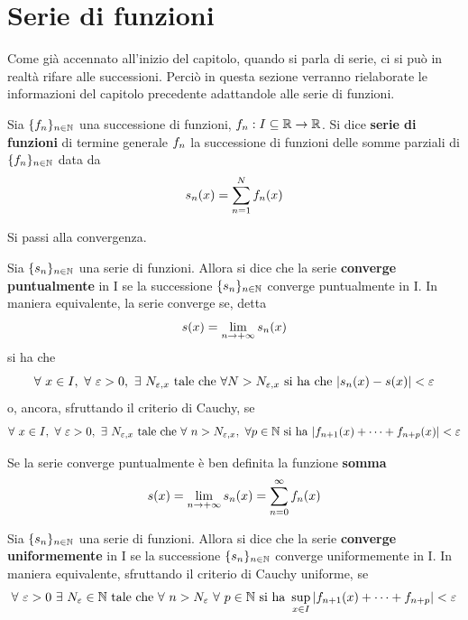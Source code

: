 \section{Serie di funzioni}
Come già accennato all'inizio del capitolo, quando si parla di serie, ci si può in realtà rifare alle successioni. Perciò in questa sezione verranno rielaborate le informazioni del capitolo precedente adattandole alle serie di funzioni.
\begin{definition}
    Sia $\{f_n\}_{n \in \mathbb{N}}$ una successione di funzioni, $f_n: I \subseteq \mathbb{R} \to \mathbb{R}$. Si dice \textbf{serie di funzioni} di termine generale $f_n$ la successione di funzioni delle somme parziali di $\{f_n\}_{n \in \mathbb{N}}$ data da
    \begin{equation}
        s_n(x)=\sum\limits_{n=1}^{N}{f_n(x)}
    \end{equation}
\end{definition}
Si passi alla convergenza.
\begin{definition}
    Sia $\{s_n\}_{n \in \mathbb{N}}$ una serie di funzioni. Allora si dice che la serie \textbf{converge puntualmente} in I se la successione $\{s_n\}_{n \in \mathbb{N}}$ converge puntualmente in I. In maniera equivalente, la serie converge se, detta
    \begin{equation}
        s(x)=\lim_{n \to +\infty}{s_n(x)}
    \end{equation}
    si ha che
    \begin{equation}
        \forall\ x \in I,\ \forall\ \varepsilon>0,\ \exists\ N_{\varepsilon, x}\ \text{tale che}\ \forall N>N_{\varepsilon, x}\ \text{si ha che}\ |\sn(x)-s(x)|< \varepsilon
    \end{equation}
    o, ancora, sfruttando il criterio di Cauchy, se
    \begin{equation}
        \forall\ x \in I,\ \forall\ \varepsilon>0,\ \exists\ N_{\varepsilon, x}\ \text{tale che}\ \forall\ n>N_{\varepsilon, x},\ \forall p \in \N\ \text{si ha}\ |f_{n+1}(x)+ \dots+ f_{n+p}(x)|<\varepsilon
    \end{equation}
\end{definition}
\begin{definition}
    Se la serie converge puntualmente è ben definita la funzione \textbf{somma}
    \begin{equation}
        s(x)=\lim_{n \to +\infty}{s_n(x)}= \sum_{n=0}^{\infty}{f_n(x)}
    \end{equation}
\end{definition}
\begin{definition}
Sia $\{s_n\}_{n \in \mathbb{N}}$ una serie di funzioni. Allora si dice che la serie \textbf{converge uniformemente} in I se la successione $\{s_n\}_{n \in \mathbb{N}}$ converge uniformemente in I. In maniera equivalente, sfruttando il criterio di Cauchy uniforme, se
\begin{equation}
\forall\ \varepsilon>0\ \exists\ N_\varepsilon \in \N\ \text{tale che}\ \forall\ n > N_\varepsilon\ \forall\ p \in \N\ \text{si ha}\ \sup_{x \in I}{|f_{n+1}(x)+\dots+f_{n+p}|}<\varepsilon 
\end{equation}
\end{definition}
